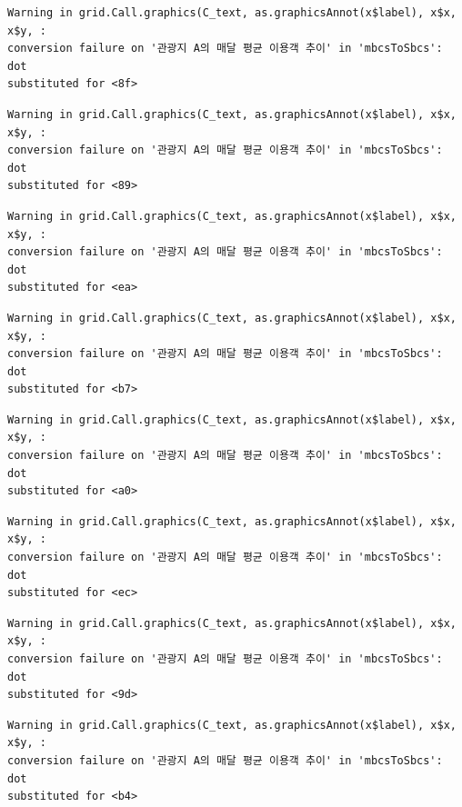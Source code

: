 \documentclass[
  letterpaper,
  DIV=11,
  numbers=noendperiod]{scrreprt}
\begin{document}
\begin{verbatim}
Warning in grid.Call.graphics(C_text, as.graphicsAnnot(x$label), x$x, x$y, :
conversion failure on '관광지 A의 매달 평균 이용객 추이' in 'mbcsToSbcs': dot
substituted for <8f>
\end{verbatim}

\begin{verbatim}
Warning in grid.Call.graphics(C_text, as.graphicsAnnot(x$label), x$x, x$y, :
conversion failure on '관광지 A의 매달 평균 이용객 추이' in 'mbcsToSbcs': dot
substituted for <89>
\end{verbatim}

\begin{verbatim}
Warning in grid.Call.graphics(C_text, as.graphicsAnnot(x$label), x$x, x$y, :
conversion failure on '관광지 A의 매달 평균 이용객 추이' in 'mbcsToSbcs': dot
substituted for <ea>
\end{verbatim}

\begin{verbatim}
Warning in grid.Call.graphics(C_text, as.graphicsAnnot(x$label), x$x, x$y, :
conversion failure on '관광지 A의 매달 평균 이용객 추이' in 'mbcsToSbcs': dot
substituted for <b7>
\end{verbatim}

\begin{verbatim}
Warning in grid.Call.graphics(C_text, as.graphicsAnnot(x$label), x$x, x$y, :
conversion failure on '관광지 A의 매달 평균 이용객 추이' in 'mbcsToSbcs': dot
substituted for <a0>
\end{verbatim}

\begin{verbatim}
Warning in grid.Call.graphics(C_text, as.graphicsAnnot(x$label), x$x, x$y, :
conversion failure on '관광지 A의 매달 평균 이용객 추이' in 'mbcsToSbcs': dot
substituted for <ec>
\end{verbatim}

\begin{verbatim}
Warning in grid.Call.graphics(C_text, as.graphicsAnnot(x$label), x$x, x$y, :
conversion failure on '관광지 A의 매달 평균 이용객 추이' in 'mbcsToSbcs': dot
substituted for <9d>
\end{verbatim}

\begin{verbatim}
Warning in grid.Call.graphics(C_text, as.graphicsAnnot(x$label), x$x, x$y, :
conversion failure on '관광지 A의 매달 평균 이용객 추이' in 'mbcsToSbcs': dot
substituted for <b4>
\end{verbatim}
\end{document}
